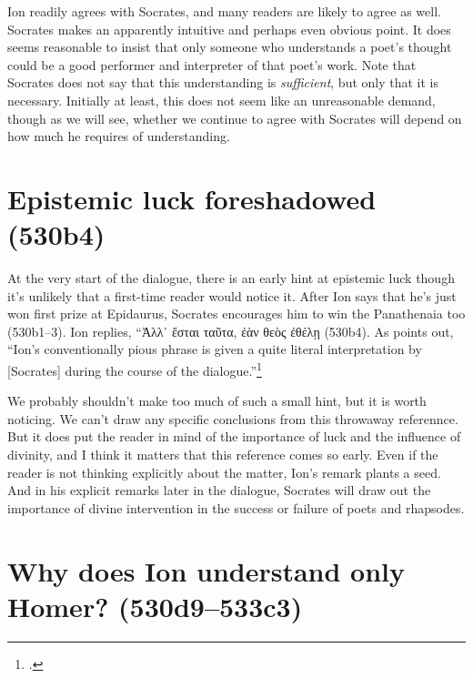 \documentclass[12pt,letterpaper]{article}
\begin{document}
Ion readily agrees with Socrates, and many readers are likely to agree as well. Socrates makes an apparently intuitive and perhaps even obvious point. It does seems reasonable to insist that only someone who understands a poet's thought could be a good performer and interpreter of that poet's work. Note that Socrates does not say that this understanding is \emph{sufficient}, but only that it is necessary. Initially at least, this does not seem like an unreasonable demand, though as we will see, whether we continue to agree with Socrates will depend on how much he requires of understanding.

\section{Epistemic luck foreshadowed (530b4)}

At the very start of the dialogue, there is an early hint at epistemic luck though it's unlikely that a first-time reader would notice it. After Ion says that he's just won first prize at Epidaurus, Socrates encourages him to win the Panathenaia too (530b1--3). Ion replies, ``\textgreek{Ἀλλ᾽ ἔσται ταῦτα, ἐὰν θεὸς ἐθέλῃ} (530b4). As \textcite[101]{murray1996} points out, ``Ion's conventionally pious phrase is given a quite literal interpretation by [Socrates] during the course of the dialogue.''\footcite[Monique Canto notes three other uses of this phrase in Plato: \textit{Phaedo} 69D and 80D and \textit{Hippias Major} 286C. The use in \textit{Hippias Major} is exactly like this one in \textit{Ion}, including the phrase \textgreek{ἔσται ταῦτα}. However in that case Socrates is the speaker, and he's being somewhat ironic][136]{canto2001}

We probably shouldn't make too much of such a small hint, but it is worth noticing. We can't draw any specific conclusions from this throwaway referennce. But it does put the reader in mind of the importance of luck and the influence of divinity, and I think it matters that this reference comes so early. Even if the reader is not thinking explicitly about the matter, Ion's remark plants a seed. And in his explicit remarks later in the dialogue, Socrates will draw out the importance of divine intervention in the success or failure of poets and rhapsodes.

\section{Why does Ion understand only Homer? (530d9--533c3)}
\end{document}
